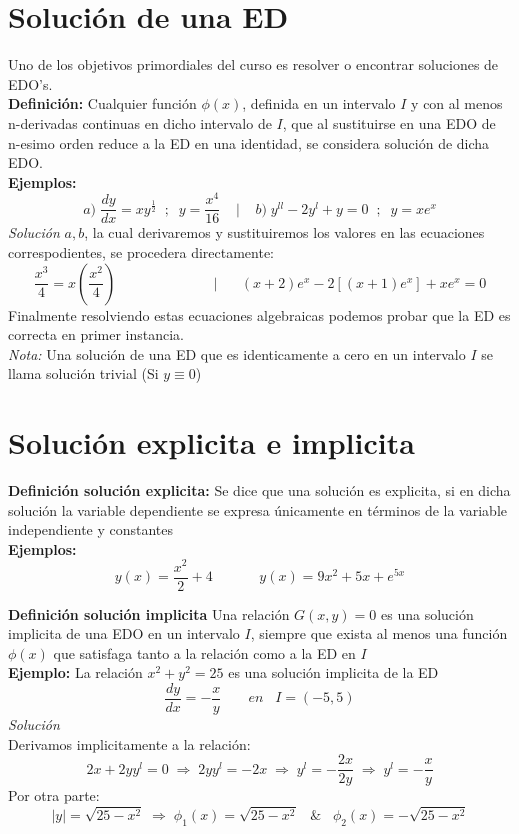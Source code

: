 \documentclass[10pt,executivepaper]{article}
\begin{document}
\section{Solución de una ED}
Uno de los objetivos primordiales del curso es resolver o encontrar soluciones de EDO's.\\
\textbf{Definición:} Cualquier función $\phi(x)$, definida en un intervalo $I$ y con al menos n-derivadas continuas en dicho intervalo de $I$, que al sustituirse en una EDO de n-esimo orden reduce a la ED en una identidad, se considera solución de dicha EDO.
\\\textbf{Ejemplos:}
\[a)\;\frac{dy}{dx}=xy^{\frac{1}{2}}\;\;;\;\;y=\frac{x^{4}}{16}\;\;\;\;|\;\;\;\;b)\;y^{ll}-2y^{l}+y=0\;\;;\;\;y=xe^{x}\]
\textit{Solución} $a,b$, la cual derivaremos y sustituiremos los valores en las ecuaciones correspodientes, se procedera directamente:
\[\frac{x^{3}}{4}=x\left(\frac{x^{2}}{4}\right)\;\;\;\;\;\;\;\;\;\;\;\;\;\;\;\;\;\;\;\;\;\;\;\;\;|\;\;\;\;\;\;(x+2)e^{x}-2[(x+1)e^{x}]+xe^{x}=0\]
Finalmente resolviendo estas ecuaciones algebraicas podemos probar que la ED es correcta en primer instancia.\\
\textit{Nota:} Una solución de una ED que es identicamente a cero en un intervalo $I$ se llama solución trivial (Si $y\equiv0$)

\section{Solución explicita e implicita}
\textbf{Definición solución explicita:} Se dice que una solución es explicita, si en dicha solución la variable dependiente se expresa únicamente en términos de la variable independiente y constantes
\\\textbf{Ejemplos:}
\[y(x)=\frac{x^{2}}{2}+4\;\;\;\;\;\;\;\;\;\;\;\;y(x)=9x^{2}+5x+e^{5x}\]

\textbf{Definición solución implicita} Una relación $G(x,y)=0$ es una solución implicita de una EDO en un intervalo $I$, siempre que exista al menos una función $\phi(x)$ que satisfaga tanto a la relación como  a la ED en $I$
\\\textbf{Ejemplo:}
La relación $x^{2}+y^{2}=25$ es una solución implicita de la ED
\[\frac{dy}{dx}=-\frac{x}{y}\;\;\;\;\;\;\;en\;\;\;I=(-5,5)\]
\textit{Solución}\\
Derivamos implicitamente a la relación:
\[2x+2yy^{l}=0 \;\Rightarrow\; 2yy^{l}=-2x \;\Rightarrow\; y^{l}=-\frac{2x}{2y}\;\Rightarrow\; y^{l}=-\frac{x}{y}\]
Por otra parte:
\[\left|y\right|=\sqrt{25-x^{2}}\;\Rightarrow\;\phi_{1}(x)=\sqrt{25-x^{2}}\;\;\;\&\;\;\;\phi_{2}(x)=-\sqrt{25-x^{2}}\]

\printindex
\end{document}
